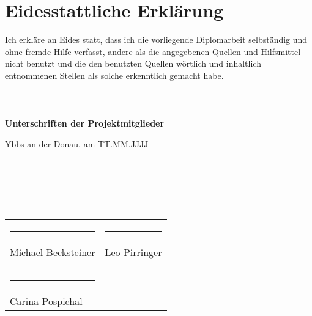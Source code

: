 \chapter*{Eidesstattliche Erklärung} 

Ich erkläre an Eides statt, dass ich die vorliegende Diplomarbeit selbständig und ohne fremde Hilfe verfasst, 
andere als die angegebenen Quellen und Hilfsmittel nicht benutzt und die den benutzten Quellen wörtlich und inhaltlich entnommenen Stellen 
als solche erkenntlich gemacht habe.
\\\\\\\\

\textbf{Unterschriften der Projektmitglieder}

Ybbs an der Donau, am TT.MM.JJJJ
\\\\\\\\\\\\

\begin{table}[ht]
  \begin{tabular}{p{8cm} p{8cm}}
    \rule{6cm}{0.01cm} & \rule{6cm}{0.01cm}\\
    Michael Becksteiner & Leo Pirringer\\
    \\
    \\
    \rule{6cm}{0.01cm}\\
    Carina Pospichal
  \end{tabular}
\end{table}